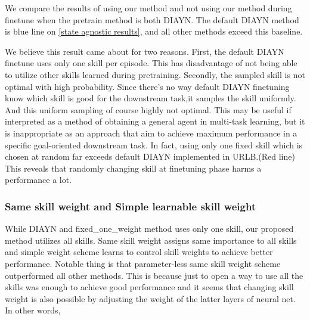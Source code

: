 We compare the results of using our method and not using our method during finetune when the pretrain method is both DIAYN.
The default DIAYN method is blue line on \cref*{state agnostic results}, and all other methods exceed this baseline.

We believe this result came about for two reasons.
First, the default DIAYN finetune uses only one skill per episode.
This has disadvantage of not being able to utilize other skills learned during pretraining.
Secondly, the sampled skill is not optimal with high probability.
Since there's no way default DIAYN finetuning know which skill is good for the downstream task,it samples the skill uniformly.
And this uniform sampling of course highly not optimal.
This may be useful if interpreted as a method of obtaining a general agent in multi-task learning,
but it is inappropriate as an approach that aim to achieve maximum performance in a specific goal-oriented downstream task.
In fact, using only one fixed skill which is chosen at random far exceeds default DIAYN implemented in URLB.(Red line)
This reveals that randomly changing skill at finetuning phase harms a performance a lot.


\subsubsection{Same skill weight and Simple learnable skill weight}
While DIAYN and fixed_one_weight method uses only one skill, our proposed method utilizes all skills.
Same skill weight assigns same importance to all skills and simple weight scheme learns to control skill weights to achieve better performance.
Notable thing is that parameter-less same skill weight scheme outperformed all other methods.
This is because just to open a way to use all the skills was enough to achieve good performance
and it seems that changing skill weight is also possible by adjusting the weight of the latter layers of neural net.
In other words, 


